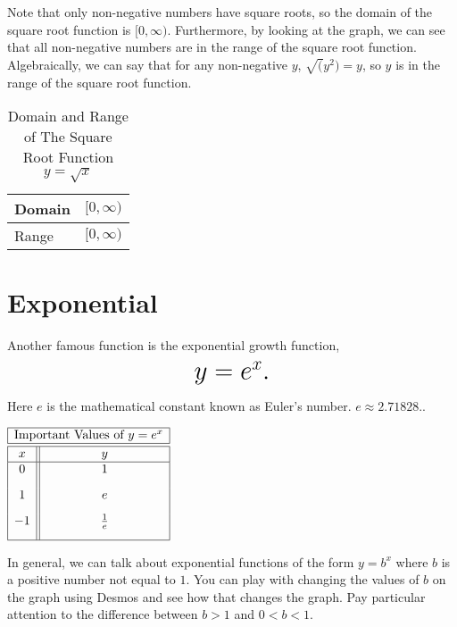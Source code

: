 \documentclass[nooutcomes]{ximera}
\begin{document}
Note that only non-negative numbers have square roots, so the domain of the square root function is $[0, \infty)$. Furthermore, by looking at the graph, we can see that all non-negative numbers are in the range of the square root function. Algebraically, we can say that for any non-negative $y$, $\sqrt(y^2) = y$, so $y$ is in the range of the square root function. 


\begin{table}[h]
\caption{\label{tab:sqrtdr}Domain and Range of The Square Root Function $y = \sqrt{x}$}
\centering
\begin{tabular}{l|l}
Domain & $[0, \infty)$ \\ \hline
Range & $[0, \infty)$
\end{tabular}
\end{table}
\newpage


\section{Exponential}
Another famous function is the exponential growth function, $$ \mbox{\huge $y=e^{x}.$}$$ 

Here $e$ is the mathematical constant known as Euler's number.  $e \approx 2.71828 .$.

\begin{image}
\end{image}

\begin{center}
\(
\begin{array}{ |c || c|  }
 \hline
 \multicolumn{2}{|c|}{\text{\normalfont Important Values of } y=e^x} \\
\hline
 \hline
 x & y\\
 \hline
 0&1\\[2ex]
 1&e\\[2ex]
 -1&\frac{1}{e}\\[2ex]
 \hline
\end{array}
\)
\end{center}

In general, we can talk about exponential functions of the form $y=b^{x}$ where $b$ is a positive number not equal to $1$.  You can play with changing the values of $b$ on the graph using Desmos and see how that changes the graph.  Pay particular attention to the difference between $b>1$ and $0<b<1$.
\end{document}
